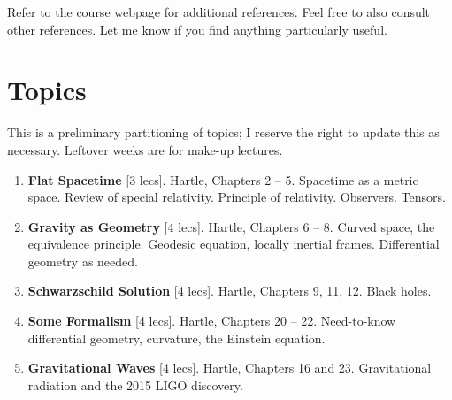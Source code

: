 \documentclass[12pt]{article}
\numberwithin{equation}{section}    %
\begin{document}
\vspace{.5em}
\noindent Refer to the course webpage for additional references. Feel free to also consult other references. Let me know if you find anything particularly useful.

\section*{Topics}

This is a preliminary partitioning of topics; I reserve the right to update this as necessary. Leftover weeks are for make-up lectures.

\begin{enumerate}
	\item \textbf{Flat Spacetime} [3 lecs]. Hartle, Chapters 2 -- 5. Spacetime as a metric space. Review of special relativity. Principle of relativity. Observers. Tensors.

	\item \textbf{Gravity as Geometry} [4 lecs]. Hartle, Chapters 6 -- 8. Curved space, the equivalence principle. Geodesic equation, locally inertial frames. Differential geometry as needed.
	
	\item \textbf{Schwarzschild Solution} [4 lecs]. Hartle, Chapters 9, 11, 12. Black holes.

	\item \textbf{Some Formalism} [4 lecs]. Hartle, Chapters 20 -- 22. Need-to-know differential geometry, curvature, the Einstein equation.


	\item \textbf{Gravitational Waves} [4 lecs]. Hartle, Chapters 16 and 23. Gravitational radiation and the 2015 LIGO discovery.
\end{enumerate}
\end{document}
